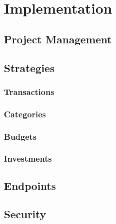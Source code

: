 \chapter{Implementation}
\label{ch:implementation}

\section{Project Management}

\section{Strategies}

	\subsection{Transactions}

	\subsection{Categories}

	\subsection{Budgets}

	\subsection{Investments}

\section{Endpoints}

\section{Security}
